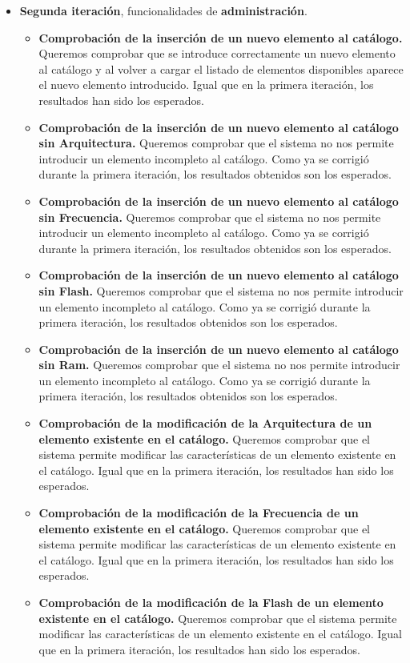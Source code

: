 \begin{itemize}
\item \textbf{Segunda iteración}, funcionalidades de \textbf{administración}.
	\begin{itemize}
	\item \textbf{Comprobación de la inserción de un nuevo elemento al catálogo.} Queremos comprobar que se introduce 				correctamente un nuevo elemento al catálogo y al volver a cargar el listado de elementos disponibles 			aparece el nuevo elemento introducido. Igual que en la primera iteración, los resultados han sido los esperados.
	\item \textbf{Comprobación de la inserción de un nuevo elemento al catálogo sin Arquitectura.} Queremos comprobar que el sistema no nos permite introducir un elemento incompleto al catálogo. Como ya se corrigió durante la primera iteración, los resultados obtenidos son los esperados. 	
	\item \textbf{Comprobación de la inserción de un nuevo elemento al catálogo sin Frecuencia.} Queremos comprobar que el sistema no nos permite introducir un elemento incompleto al catálogo. Como ya se corrigió durante la primera iteración, los resultados obtenidos son los esperados.	
	\item \textbf{Comprobación de la inserción de un nuevo elemento al catálogo sin Flash.} Queremos comprobar que el sistema no nos permite introducir un elemento incompleto al catálogo. Como ya se corrigió durante la primera iteración, los resultados obtenidos son los esperados.
	\item \textbf{Comprobación de la inserción de un nuevo elemento al catálogo sin Ram.} Queremos comprobar que el sistema no nos permite introducir un elemento incompleto al catálogo. Como ya se corrigió durante la primera iteración, los resultados obtenidos son los esperados.
	\item \textbf{Comprobación de la modificación de la Arquitectura de un elemento existente en el catálogo.} Queremos comprobar que el sistema permite modificar las características de un elemento existente en el catálogo. Igual que en la primera iteración, los resultados han sido los esperados.
	\item \textbf{Comprobación de la modificación de la Frecuencia de un elemento existente en el catálogo.} Queremos comprobar que el sistema permite modificar las características de un elemento existente en el catálogo. Igual que en la primera iteración, los resultados han sido los esperados.	
	\item \textbf{Comprobación de la modificación de la Flash de un elemento existente en el catálogo.}	Queremos comprobar que el sistema permite modificar las características de un elemento existente en el catálogo. Igual que en la primera iteración, los resultados han sido los esperados.

\end{itemize}
\end{itemize}

